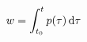 \begin{multicols}{2}
{        %


        \begin{equation*}
            w = \int_{t_0}^{t}{p(\tau) \,\mathrm{d}\tau}
        \end{equation*}

    }

\end{multicols}
